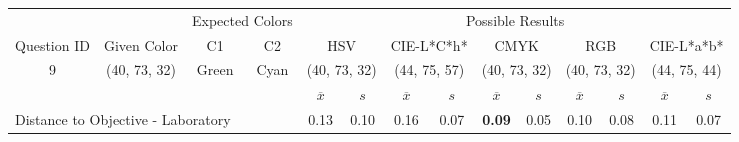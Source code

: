 \begin{table}[H]
  \resizebox{\textwidth}{!} {
  \begin{tabular}{lccccccccccccc}
    \hline
    \multicolumn{1}{c}{}                              &                                      & \multicolumn{2}{c}{Expected Colors}                   & \multicolumn{10}{c}{Possible Results}                                                                                                                                                                                                                                                                                        \\ \cline{3-14}
    \multicolumn{1}{c}{\multirow{-2}{*}{Question ID}} & \multirow{-2}{*}{Given Color}        & C1                       & C2                         & \multicolumn{2}{c}{HSV}                                        & \multicolumn{2}{c}{CIE-L*C*h*}                                 & \multicolumn{2}{c}{CMYK}                                       & \multicolumn{2}{c}{RGB}                                        & \multicolumn{2}{c}{CIE-L*a*b*}                                 \\ \hline
    \multicolumn{1}{c}{9}                             & \cellcolor[HTML]{00FF80}(40, 73, 32) & \multicolumn{1}{c|}{Green} & \multicolumn{1}{c|}{Cyan}  & \multicolumn{2}{c|}{\cellcolor[HTML]{00FF80}(40, 73, 32)}      & \multicolumn{2}{c|}{\cellcolor[HTML]{00FFB7}(44, 75, 57)}       & \multicolumn{2}{c|}{\cellcolor[HTML]{00FF80}(40, 73, 32)}       & \multicolumn{2}{c|}{\cellcolor[HTML]{00FF80}(40, 73, 32)}       & \multicolumn{2}{c|}{\cellcolor[HTML]{46FF9C}(44, 75, 44)}       \\ \hline
                                                      & \multicolumn{1}{l}{}                 & \multicolumn{1}{l}{}     & \multicolumn{1}{l}{}       & \multicolumn{1}{c}{$\overline{x}$} & \multicolumn{1}{c}{$s$} & \multicolumn{1}{c}{$\overline{x}$} & \multicolumn{1}{c}{$s$} & \multicolumn{1}{c}{$\overline{x}$} & \multicolumn{1}{c}{$s$} & \multicolumn{1}{c}{$\overline{x}$} & \multicolumn{1}{c}{$s$} & \multicolumn{1}{c}{$\overline{x}$} & \multicolumn{1}{c}{$s$} \\ \hline
    \multicolumn{4}{l}{Distance to Objective - Laboratory}                                                                                           & \multicolumn{1}{|c}{0.13}       & \multicolumn{1}{c|}{0.10}    & \multicolumn{1}{|c}{0.16}       & \multicolumn{1}{c|}{0.07}    & \multicolumn{1}{|c}{\textbf{0.09}}       & \multicolumn{1}{c|}{0.05}    & \multicolumn{1}{|c}{0.10}       & \multicolumn{1}{c|}{0.08}    & \multicolumn{1}{|c}{0.11}       & \multicolumn{1}{c|}{0.07}    \\

\end{tabular}}
\end{table}
